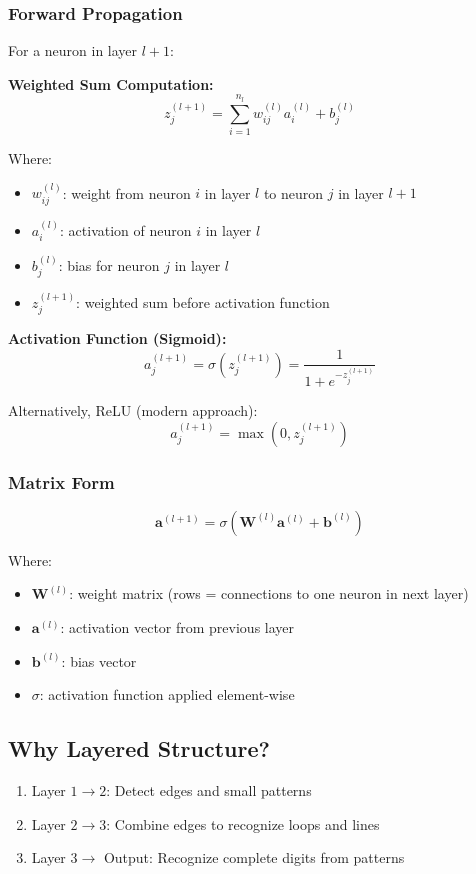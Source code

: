 \documentclass[11pt,a4paper]{article}
\begin{document}
\subsubsection{Forward Propagation}
For a neuron in layer $l+1$:

\textbf{Weighted Sum Computation:}
\[
z_j^{(l+1)} = \sum_{i=1}^{n_l} w_{ij}^{(l)} a_i^{(l)} + b_j^{(l)}
\]

Where:
\begin{itemize}
    \item $w_{ij}^{(l)}$: weight from neuron $i$ in layer $l$ to neuron $j$ in layer $l+1$
    \item $a_i^{(l)}$: activation of neuron $i$ in layer $l$
    \item $b_j^{(l)}$: bias for neuron $j$ in layer $l$
    \item $z_j^{(l+1)}$: weighted sum before activation function
\end{itemize}

\textbf{Activation Function (Sigmoid):}
\[
a_j^{(l+1)} = \sigma(z_j^{(l+1)}) = \frac{1}{1 + e^{-z_j^{(l+1)}}}
\]

Alternatively, ReLU (modern approach):
\[
a_j^{(l+1)} = \max(0, z_j^{(l+1)})
\]

\subsubsection{Matrix Form}
\[
\mathbf{a}^{(l+1)} = \sigma\left(\mathbf{W}^{(l)} \mathbf{a}^{(l)} + \mathbf{b}^{(l)}\right)
\]

Where:
\begin{itemize}
    \item $\mathbf{W}^{(l)}$: weight matrix (rows = connections to one neuron in next layer)
    \item $\mathbf{a}^{(l)}$: activation vector from previous layer
    \item $\mathbf{b}^{(l)}$: bias vector
    \item $\sigma$: activation function applied element-wise
\end{itemize}

\subsection{Why Layered Structure?}
\begin{enumerate}
    \item Layer $1 \to 2$: Detect edges and small patterns
    \item Layer $2 \to 3$: Combine edges to recognize loops and lines
    \item Layer $3 \to$ Output: Recognize complete digits from patterns
\end{enumerate}
\end{document}
